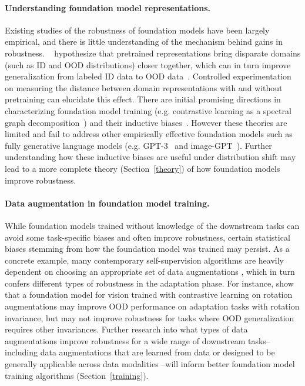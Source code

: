 \paragraph{Understanding foundation model representations.} Existing studies of the robustness of foundation models have been largely empirical, and there is little understanding of the mechanism behind gains in robustness.
~\citet{sun2019unsupervised} hypothesize that pretrained representations bring disparate domains (such as ID and OOD distributions) closer together, which can in turn improve generalization from labeled ID data to OOD data~\citep{ben2010theory}. Controlled experimentation on measuring the distance between domain representations with and without pretraining can elucidate this effect. There are initial promising directions in characterizing foundation model training (e.g. contrastive learning as a spectral graph decomposition~\citep{haochen2021spectral}) and their inductive biases~\citep{SaMa20mat,lee2020predicting,zhang20ont,xie2020selftraining}. However these theories are limited and fail to address other empirically effective foundation models such as fully generative language models (e.g. GPT-3~\citep{brown2020gpt3} and image-GPT~\citep{chen2020imagegpt}). Further understanding how these inductive biases are useful under distribution shift may lead to a more complete theory (Section~\ref{theory}) of how foundation models improve robustness. 

\paragraph{Data augmentation in foundation model training.} While foundation models trained without knowledge of the downstream tasks can avoid some task-specific biases and often improve robustness, certain statistical biases stemming from how the foundation model was trained may persist. As a concrete example, many contemporary self-supervision algorithms are heavily dependent on choosing an appropriate set of data augmentations \citep{chen2020simclr}, which in turn confers different types of robustness in the adaptation phase. For instance, \citet{xiao2021contrastive} show that a foundation model for vision trained with contrastive learning on rotation augmentations may improve OOD performance on adaptation tasks with rotation invariance, but may not improve robustness for tasks where OOD generalization requires other invariances. Further research into what types of data augmentations improve robustness for a wide range of downstream tasks--including data augmentations that are learned from data \citep{wong2020learningpert,Tamkin2021ViewmakerNL} or designed to be generally applicable across data modalities \citep{verma2021towards}--will inform better foundation model training algorithms (Section~\ref{training}).

